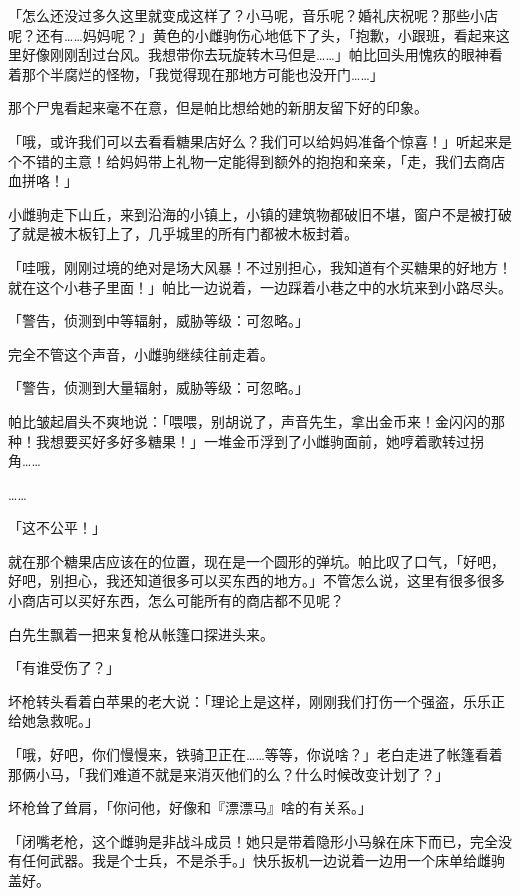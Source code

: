 「怎么还没过多久这里就变成这样了？小马呢，音乐呢？婚礼庆祝呢？那些小店呢？还有……妈妈呢？」黄色的小雌驹伤心地低下了头，「抱歉，小跟班，看起来这里好像刚刚刮过台风。我想带你去玩旋转木马但是……」帕比回头用愧疚的眼神看着那个半腐烂的怪物，「我觉得现在那地方可能也没开门……」

那个尸鬼看起来毫不在意，但是帕比想给她的新朋友留下好的印象。

「哦，或许我们可以去看看糖果店好么？我们可以给妈妈准备个惊喜！」听起来是个不错的主意！给妈妈带上礼物一定能得到额外的抱抱和亲亲，「走，我们去商店血拼咯！」

小雌驹走下山丘，来到沿海的小镇上，小镇的建筑物都破旧不堪，窗户不是被打破了就是被木板钉上了，几乎城里的所有门都被木板封着。

「哇哦，刚刚过境的绝对是场大风暴！不过别担心，我知道有个买糖果的好地方！就在这个小巷子里面！」帕比一边说着，一边踩着小巷之中的水坑来到小路尽头。

「{\mt 警告，侦测到中等辐射，威胁等级：可忽略。}」

完全不管这个声音，小雌驹继续往前走着。

「{\mt 警告，侦测到大量辐射，威胁等级：可忽略。}」

帕比皱起眉头不爽地说：「喂喂，别胡说了，声音先生，拿出金币来！金闪闪的那种！我想要买好多好多糖果！」一堆金币浮到了小雌驹面前，她哼着歌转过拐角……{}

……{}

「这不公平！」

就在那个糖果店应该在的位置，现在是一个圆形的弹坑。帕比叹了口气，「好吧，好吧，别担心，我还知道很多可以买东西的地方。」不管怎么说，这里有很多很多小商店可以买好东西，怎么可能所有的商店都不见呢？

\horizonline


白先生飘着一把来复枪从帐篷口探进头来。

「有谁受伤了？」

坏枪转头看着白苹果的老大说：「理论上是这样，刚刚我们打伤一个强盗，乐乐正给她急救呢。」

「哦，好吧，你们慢慢来，铁骑卫正在……等等，你说啥？」老白走进了帐篷看着那俩小马，「我们难道不就是来消灭他们的么？什么时候改变计划了？」

坏枪耸了耸肩，「你问他，好像和『漂漂马』啥的有关系。」

「闭嘴老枪，这个雌驹是非战斗成员！她只是带着隐形小马躲在床下而已，完全没有任何武器。我是个士兵，不是杀手。」快乐扳机一边说着一边用一个床单给雌驹盖好。

